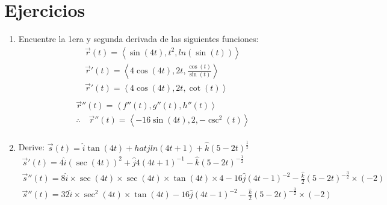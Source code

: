 \documentclass{article}
\begin{document}
\section{Ejercicios}
\begin{enumerate}
    \item Encuentre la 1era y segunda derivada de las siguientes funciones:
        \begin{align*}
            \vec{r}(t) = \left\langle \sin(4t),t^2,ln(\sin(t)) \right\rangle \\ 
            \vec{r}'(t) = \left\langle 4\cos(4t),2t,\frac{\cos(t)}{\sin(t)}  \right\rangle \\ 
            \vec{r}'(t) = \left\langle 4\cos(4t),2t,\cot(t) \right\rangle \\ 
        \end{align*}
        \begin{align*}
            \vec{r}''(t) = \left\langle f''(t),g''(t),h''(t) \right\rangle \\ 
            \therefore \quad \vec{r}''(t) = \left\langle -16\sin(4t),2,-\csc^2(t) \right\rangle \\ 
        \end{align*}
    
    \item Derive: $\vec{s}(t) = \hat{i} \tan(4t) + hat{j}ln(4t+1) + \hat{k} (5-2t)^{\frac{1}{2} }$
        \begin{align*}
            \vec{s}'(t) = 4 \hat{i} (\sec(4t))^2 + \hat{j} 4(4t+1)^{-1} -\hat{k} (5-2t)^{-\frac{1}{2} } \\ 
            \vec{s}''(t) = 8 \hat{i} \times \sec(4t)\times  \sec(4t)\times  \tan (4t) \times 4  - 16 \hat{j} (4t-1)^{-2} - \frac{\hat{k}}{2} (5-2t)^{-\frac{3}{2} } \times (-2) \\  
            \vec{s}''(t) = 32 \hat{i} \times \sec^2(4t)\times  \tan (4t)  - 16 \hat{j} (4t-1)^{-2} - \frac{\hat{k}}{2} (5-2t)^{-\frac{3}{2} } \times (-2) \\ 
        \end{align*}
\end{enumerate}
\end{document}
